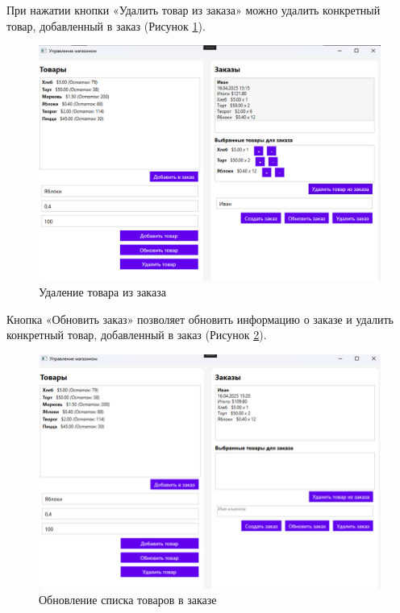 \documentclass[12pt]{article}
\begin{document}
\pagebreak


При нажатии кнопки «Удалить товар из заказа» можно удалить конкретный товар, добавленный в заказ (Рисунок \ref{fig:demo7}).

\begin{figure}[ht]
	\centering
	\includegraphics[width=1.0\textwidth]{fig/image 64.png}
	\caption{Удаление товара из заказа}
	\label{fig:demo7}
\end{figure}

\pagebreak

Кнопка «Обновить заказ» позволяет обновить информацию о заказе и удалить конкретный товар, добавленный в заказ (Рисунок \ref{fig:demo8}).

\begin{figure}[ht]
	\centering
	\includegraphics[width=1.0\textwidth]{fig/image 65.png}
	\caption{Обновление списка товаров в заказе}
	\label{fig:demo8}
\end{figure}
\end{document}
